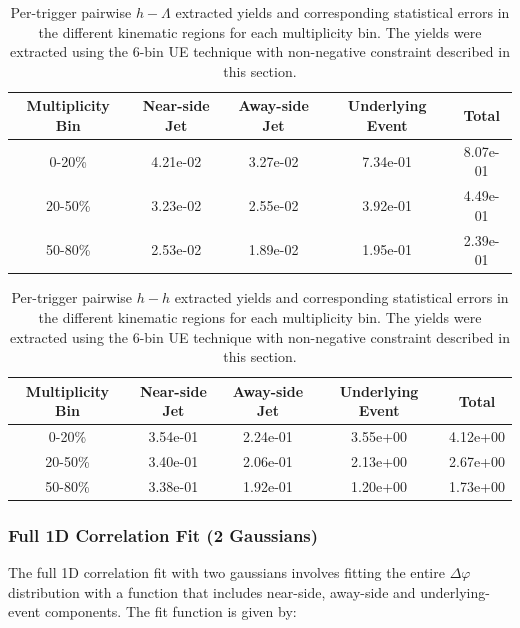 \documentclass[ALICE,manyauthors]{ALICE_analysis_notes}
\begin{document}
	
\begin{table}[h!]
\centering
\begin{tabular}{| c || c | c | c | c | }
\hline
Multiplicity Bin & Near-side Jet & Away-side Jet & Underlying Event & Total  \\
\hline
	
0-20\% & 4.21e-02  & 3.27e-02  & 7.34e-01 & 8.07e-01 \\
20-50\% & 3.23e-02 & 2.55e-02  & 3.92e-01 & 4.49e-01 \\
50-80\% & 2.53e-02 & 1.89e-02  & 1.95e-01 & 2.39e-01 \\
	
\hline
\end{tabular}
\caption{Per-trigger pairwise $h-\Lambda$ extracted yields and corresponding statistical errors in the different kinematic regions for each multiplicity bin. The yields were extracted using the 6-bin UE technique with non-negative constraint described in this section.}
\label{h_lambda_yield_table_6bin_nonzero}
\end{table}
	
\begin{table}[h!]
\centering
\begin{tabular}{| c || c | c | c | c | }
\hline
Multiplicity Bin & Near-side Jet & Away-side Jet & Underlying Event & Total  \\
\hline

0-20\% & 3.54e-01  & 2.24e-01  & 3.55e+00 & 4.12e+00 \\
20-50\% & 3.40e-01 & 2.06e-01  & 2.13e+00 & 2.67e+00 \\
50-80\% & 3.38e-01 & 1.92e-01  & 1.20e+00 & 1.73e+00 \\

\hline
\end{tabular}
\caption{Per-trigger pairwise $h-h$ extracted yields and corresponding statistical errors in the different kinematic regions for each multiplicity bin. The yields were extracted using the 6-bin UE technique with non-negative constraint described in this section.}
\label{h_h_yield_table_6bin_nonzero}
\end{table}

\clearpage

\subsubsection{Full 1D Correlation Fit (2 Gaussians)}
\label{full_correlation_fit}
The full 1D correlation fit with two gaussians involves fitting the entire $\Delta\varphi$ distribution with a function that includes near-side, away-side and underlying-event components. The fit function is given by:
\end{document}
